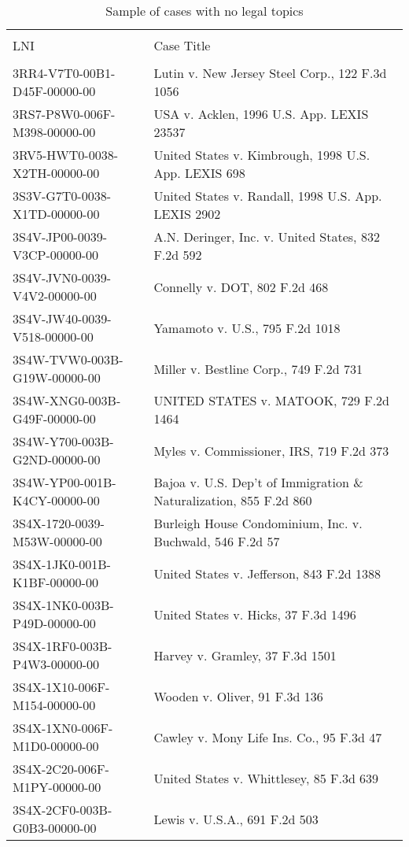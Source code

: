 \documentclass[10pt, letterpaper]{article}
\begin{document}
\begin{spacing}{1.0}
\begin{longtable}{p{2.5in}p{4in}}
    \caption{Sample of cases with no legal topics}\\
    \hline\\[-6pt]
    LNI & Case Title\\[2pt]
    \hline \\[-6pt]
    3RR4-V7T0-00B1-D45F-00000-00 & Lutin v. New Jersey Steel Corp., 122 F.3d 1056\\
    3RS7-P8W0-006F-M398-00000-00 & USA v. Acklen, 1996 U.S. App. LEXIS 23537\\
    3RV5-HWT0-0038-X2TH-00000-00 & United States v. Kimbrough, 1998 U.S. App. LEXIS 698\\
    3S3V-G7T0-0038-X1TD-00000-00 & United States v. Randall, 1998 U.S. App. LEXIS 2902\\
    3S4V-JP00-0039-V3CP-00000-00 & A.N. Deringer, Inc. v. United States, 832 F.2d 592\\
    3S4V-JVN0-0039-V4V2-00000-00 & Connelly v. DOT, 802 F.2d 468\\
    3S4V-JW40-0039-V518-00000-00 & Yamamoto v. U.S., 795 F.2d 1018\\
    3S4W-TVW0-003B-G19W-00000-00 & Miller v. Bestline Corp., 749 F.2d 731\\
    3S4W-XNG0-003B-G49F-00000-00 & UNITED STATES v. MATOOK, 729 F.2d 1464\\
    3S4W-Y700-003B-G2ND-00000-00 & Myles v. Commissioner, IRS, 719 F.2d 373\\
    3S4W-YP00-001B-K4CY-00000-00 & Bajoa v. U.S. Dep't of Immigration \& Naturalization, 855 F.2d 860\\
    3S4X-1720-0039-M53W-00000-00 & Burleigh House Condominium, Inc. v. Buchwald, 546 F.2d 57\\
    3S4X-1JK0-001B-K1BF-00000-00 & United States v. Jefferson, 843 F.2d 1388\\
    3S4X-1NK0-003B-P49D-00000-00 & United States v. Hicks, 37 F.3d 1496\\
    3S4X-1RF0-003B-P4W3-00000-00 & Harvey v. Gramley, 37 F.3d 1501\\
    3S4X-1X10-006F-M154-00000-00 & Wooden v. Oliver, 91 F.3d 136\\
    3S4X-1XN0-006F-M1D0-00000-00 & Cawley v. Mony Life Ins. Co., 95 F.3d 47\\
    3S4X-2C20-006F-M1PY-00000-00 & United States v. Whittlesey, 85 F.3d 639\\
    3S4X-2CF0-003B-G0B3-00000-00 & Lewis v. U.S.A., 691 F.2d 503\\

\end{longtable}
\end{spacing}
\end{document}
